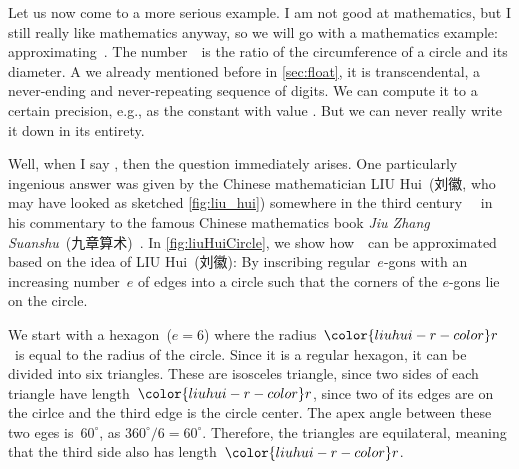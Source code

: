 %
%
\def\liuhuir{\ensuremath{{\color{liuhui-r-color}r}}}%
%
\def\liuhuiss{\ensuremath{{\color{liuhui-s6-color}s_6}}}%
%
\def\liuhuist{\ensuremath{{\color{liuhui-s12-color}s_{12}}}}%
%
\def\liuhuiy{\ensuremath{{\color{liuhui-y-color}y}}}%
%
\def\liuhuix{\ensuremath{{\color{liuhui-x-color}x}}}%
%
\def\liuhuistf{\ensuremath{{\color{liuhui-s24-color}s_{24}}}}%
%
Let us now come to a more serious example.
I am not good at mathematics, but I still really like mathematics anyway, so we will go with a mathematics example: approximating~\numberPi.
The number~\numberPi\ is the ratio of the circumference of a circle and its diameter.
A we already mentioned before in \cref{sec:float}, it is transcendental, a never-ending and never-repeating sequence of digits.
We can compute it to a certain precision, e.g., as the  constant  with value .
But we can never really write it down in its entirety.

Well, when I say , then the question  immediately arises.
One particularly ingenious answer was given by the Chinese mathematician LIU Hui~(刘徽, who may have looked as sketched \cref{fig:liu_hui}) somewhere in the third century~~\cite{OR2003LH,Y2024COACMMLHFHTIOMACE} in his commentary to the famous Chinese mathematics book \emph{Jiu Zhang Suanshu}~(九章算术)~\cite{OR2003LH,SCL1999TNCOTMACAC,S1998LHATFGAOCM,D2010AALHOCAS,C2002LFLHADWTDM}.
In \cref{fig:liuHuiCircle}, we show how~\numberPi\ can be approximated based on the idea of LIU Hui~(刘徽):
By inscribing regular~$e$\nobreakdashes-gons with an increasing number~$e$ of edges into a circle such that the corners of the $e$\nobreakdashes-gons lie on the circle.

We start with a hexagon~($e=6$) where the radius~\liuhuir\ is equal to the radius of the circle.
Since it is a regular hexagon, it can be divided into six triangles.
These are isosceles triangle, since two sides of each triangle have length~\liuhuir, since two of its edges are on the cirlce and the third edge is the circle center.
The apex angle between these two eges is~$60^{\circ}$, as $360^{\circ}/6=60^{\circ}$.
Therefore, the triangles are equilateral, meaning that the third side also has length~\liuhuir.

